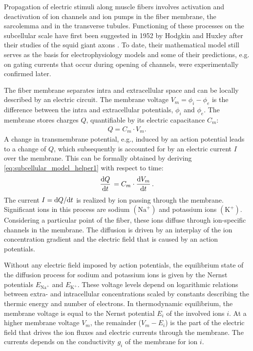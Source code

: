Propagation of electric stimuli along muscle fibers involves activation and deactivation of ion channels and ion pumps in the fiber membrane, the sarcolemma and in the transverse tubules.
Functioning of these processes on the subcellular scale have first been suggested in 1952 by Hodgkin and Huxley after their studies of the squid giant axons \cite{Hodgkin1952,hodgkin1952propagation}. To date, their mathematical model still serves as the basis for electrophysiology models and some of their predictions, e.g. on gating currents that occur during opening of channels, were experimentally confirmed later.

The fiber membrane separates intra and extracellular space and can be locally described by an electric circuit. The membrane voltage $V_m=\phi_i-\phi_e$ is the difference between the intra and extracellular potentials, $\phi_i$ and $\phi_e$. The membrane stores charges $Q$, quantifiable by its electric capacitance $C_m$:
\begin{align}\label{eq:subcellular_model_helper1}
  Q = C_m\cdot V_m.  
\end{align}
%
A change in transmembrane potential, e.g., induced by an action potential leads to a change of $Q$, which subsequently is accounted for by an electric current $I$ over the membrane. This can be formally obtained by deriving \cref{eq:subcellular_model_helper1} with respect to time:%
\begin{align}\label{eq:subcellular_model_helper2}
  \d{Q}{t} = C_m \cdot \d{V_m}{t}.
\end{align}
%
The current $I=\d Q / \d t$ is realized by ion passing through the membrane.
Significant ions in this process are sodium $(\text{Na}^{+})$ and potassium ions $(\text{K}^{+})$.
Considering a particular point of the fiber, these ions diffuse through ion-specific channels in the membrane.
The diffusion is driven by an interplay of the ion concentration gradient and the electric field that is caused by an action potentials.

Without any electric field imposed by action potentials, the equilibrium state of the diffusion process for sodium and potassium ions is given by the Nernst potentials $E_{\text{Na}^{+}}$ and $E_{\text{K}^{+}}$. These voltage levels depend on logarithmic relations between extra- and intracellular concentrations scaled by constants describing the thermic energy and number of electrons.
In thermodynamic equilibrium, the membrane voltage is equal to the Nernst potential $E_i$ of the involved ions $i$. 
At a higher membrane voltage $V_m$, the remainder ($V_m - E_i$) is the part of the electric field that drives the
ion fluxes and electric currents through the membrane. The currents depends on the conductivity $g_i$ of
the membrane for ion $i$. 


